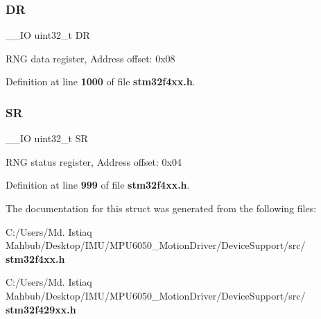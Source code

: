 \subsubsection{DR}
{\footnotesize\ttfamily \+\_\+\+\_\+\+IO uint32\+\_\+t DR}

R\+NG data register, Address offset\+: 0x08 

Definition at line \textbf{ 1000} of file \textbf{ stm32f4xx.\+h}.

\mbox{\label{structRNG__TypeDef_af6aca2bbd40c0fb6df7c3aebe224a360}} 
\subsubsection{SR}
{\footnotesize\ttfamily \+\_\+\+\_\+\+IO uint32\+\_\+t SR}

R\+NG status register, Address offset\+: 0x04 

Definition at line \textbf{ 999} of file \textbf{ stm32f4xx.\+h}.



The documentation for this struct was generated from the following files\+:\begin{DoxyCompactItemize}
\item 
C\+:/\+Users/\+Md. Istiaq Mahbub/\+Desktop/\+I\+M\+U/\+M\+P\+U6050\+\_\+\+Motion\+Driver/\+Device\+Support/src/\textbf{ stm32f4xx.\+h}\item 
C\+:/\+Users/\+Md. Istiaq Mahbub/\+Desktop/\+I\+M\+U/\+M\+P\+U6050\+\_\+\+Motion\+Driver/\+Device\+Support/src/\textbf{ stm32f429xx.\+h}\end{DoxyCompactItemize}
